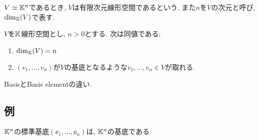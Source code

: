 \begin{definition}
  $V\simeq \mathbb{K}^n$であるとき,
  $V$は有限次元線形空間であるという.
  また$n$を$V$の次元と呼び,
  $\dim_{\mathbb{K}}(V)$で表す.
\end{definition}
\begin{lemma}
  $V$を$\mathbb{K}$線形空間とし, $n>0$とする.
  次は同値である:
  \begin{enumerate}
  \item $\dim_{\mathbb{K}}(V)=n$
  \item $(v_1,\ldots,v_n)$が$V$の基底となるような$v_1,\ldots,v_n\in V$が取れる.
  \end{enumerate}
\end{lemma}

\begin{remark}
BasisとBasis elementの違い.
\end{remark}

\subsection{例}
\begin{example}
  $\mathbb{K}^n$の標準基底$(\ee_1,\ldots,\ee_n)$は,
  $\mathbb{K}^n$の基底である.
\end{example}

